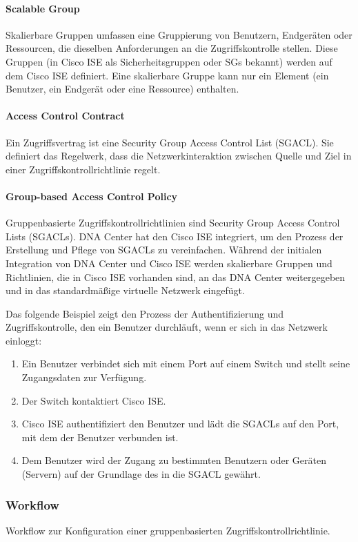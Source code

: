 \paragraph{Scalable Group}
Skalierbare Gruppen umfassen eine Gruppierung von Benutzern, Endgeräten oder Ressourcen, die dieselben Anforderungen an die Zugriffskontrolle stellen. Diese Gruppen (in Cisco ISE als Sicherheitsgruppen oder SGs bekannt) werden auf dem Cisco ISE definiert. Eine skalierbare Gruppe kann nur ein Element (ein Benutzer, ein Endgerät oder eine Ressource) enthalten.

\paragraph{Access Control Contract}
Ein Zugriffsvertrag ist eine Security Group Access Control List (SGACL). Sie definiert das Regelwerk, dass die Netzwerkinteraktion zwischen Quelle und Ziel in einer Zugriffskontrollrichtlinie regelt.

\paragraph{Group-based Access Control Policy}
Gruppenbasierte Zugriffskontrollrichtlinien sind Security Group Access Control Lists (SGACLs). DNA Center hat den Cisco ISE integriert, um den Prozess der Erstellung und Pflege von SGACLs zu vereinfachen. Während der initialen Integration von DNA Center und Cisco ISE werden skalierbare Gruppen und Richtlinien, die in Cisco ISE vorhanden sind, an das DNA Center weitergegeben und in das standardmäßige virtuelle Netzwerk eingefügt.

Das folgende Beispiel zeigt den Prozess der Authentifizierung und Zugriffskontrolle, den ein Benutzer durchläuft, wenn er sich in das Netzwerk einloggt:
\begin{enumerate}
	\item Ein Benutzer verbindet sich mit einem Port auf einem Switch und stellt seine Zugangsdaten zur Verfügung.
	\item Der Switch kontaktiert Cisco ISE.
	\item Cisco ISE authentifiziert den Benutzer und lädt die SGACLs auf den Port, mit dem der Benutzer verbunden ist.
	\item  Dem Benutzer wird der Zugang zu bestimmten Benutzern oder Geräten (Servern) auf der Grundlage des in die SGACL gewährt.
\end{enumerate}


\subsubsection{Workflow}
Workflow zur Konfiguration einer gruppenbasierten Zugriffskontrollrichtlinie.

